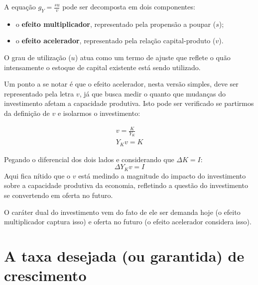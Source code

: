 \documentclass[
  brazilian,
  letterpaper,
  DIV=11,
  numbers=noendperiod]{scrreprt}
\providecommand{\tightlist}{%
  \setlength{\itemsep}{0pt}\setlength{\parskip}{0pt}}
\begin{document}
\begin{tcolorbox}[enhanced jigsaw, arc=.35mm, bottomrule=.15mm, bottomtitle=1mm, breakable, colback=white, colbacktitle=quarto-callout-note-color!10!white, colframe=quarto-callout-note-color-frame, coltitle=black, left=2mm, leftrule=.75mm, opacityback=0, opacitybacktitle=0.6, rightrule=.15mm, title=\textcolor{quarto-callout-note-color}{\faInfo}\hspace{0.5em}{A decomposição da taxa efetiva}, titlerule=0mm, toprule=.15mm, toptitle=1mm]

A equação \(g_Y = \frac{s u}{v}\) pode ser decomposta em dois
componentes:

\begin{itemize}
\tightlist
\item
  o \textbf{efeito multiplicador}, representado pela propensão a poupar
  (\(s\));
\item
  o \textbf{efeito acelerador}, representado pela relação
  capital-produto (\(v\)).
\end{itemize}

O grau de utilização (\(u\)) atua como um termo de ajuste que reflete o
quão intensamente o estoque de capital existente está sendo utilizado.

\end{tcolorbox}

Um ponto a se notar é que o efeito acelerador, nesta versão simples,
deve ser representado pela letra \(v\), já que busca medir o quanto que
mudanças do investimento afetam a capacidade produtiva. Isto pode ser
verificado se partirmos da definição de \(v\) e isolarmos o
investimento:

\[
\begin{aligned}
v= \frac{K}{Y_K}\\
Y_K v = K
\end{aligned}\]

Pegando o diferencial dos dois lados e considerando que
\(\Delta K = I\): \[\Delta Y_K v = I\] Aqui fica nítido que o \(v\) está
medindo a magnitude do impacto do investimento sobre a capacidade
produtiva da economia, refletindo a questão do investimento se
convertendo em oferta no futuro.

O caráter dual do investimento vem do fato de ele ser demanda hoje (o
efeito multiplicador captura isso) e oferta no futuro (o efeito
acelerador considera isso).

\section{A taxa desejada (ou garantida) de
crescimento}\label{sec-garantida-harrod}
\end{document}
